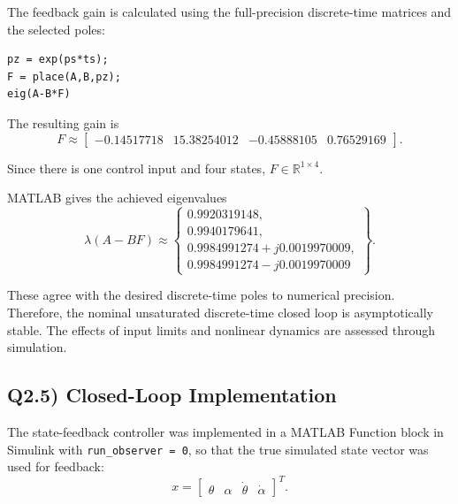 \documentclass[11pt,a4paper]{article}
\begin{document}
The feedback gain is calculated using the full-precision discrete-time matrices and the selected poles:
\begin{verbatim}
pz = exp(ps*ts);
F = place(A,B,pz);
eig(A-B*F)
\end{verbatim}

The resulting gain is
\begin{equation}
    F \approx
    \begin{bmatrix}
        -0.14517718 &
        15.38254012 &
        -0.45888105 &
        0.76529169
    \end{bmatrix}.
\end{equation}

Since there is one control input and four states,
$F\in\mathbb{R}^{1\times4}$.

MATLAB gives the achieved eigenvalues
\begin{equation}
    \lambda(A-BF)\approx
    \left\{
    \begin{array}{l}
        0.9920319148,\\
        0.9940179641,\\
        0.9984991274+j0.0019970009,\\
        0.9984991274-j0.0019970009
    \end{array}
    \right\}.
\end{equation}

These agree with the desired discrete-time poles to numerical precision. Therefore, the nominal unsaturated discrete-time closed loop is asymptotically stable. The effects of input limits and nonlinear dynamics are assessed through simulation.

\subsection*{Q2.5) Closed-Loop Implementation}

The state-feedback controller was implemented in a MATLAB Function block in Simulink with
\texttt{run\_observer = 0}, so that the true simulated state
vector was used for feedback:
\begin{equation}
    x=
    \begin{bmatrix}
        \theta & \alpha & \dot{\theta} & \dot{\alpha}
    \end{bmatrix}^{T}.
\end{equation}
\end{document}
